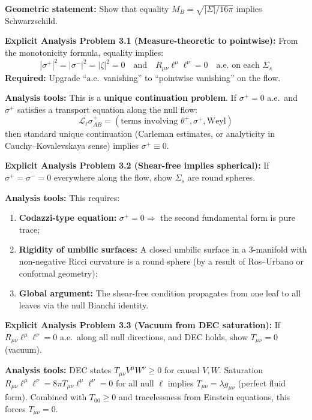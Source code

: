 \begin{remark}
\textbf{Geometric statement:} Show that equality $M_B = \sqrt{|\Sigma|/16\pi}$ implies Schwarzschild.

\textbf{Explicit Analysis Problem 3.1 (Measure-theoretic to pointwise):}
From the monotonicity formula, equality implies:
\begin{equation}
\label{eq:rigidity-vanishing}
|\sigma^+|^2 = |\sigma^-|^2 = |\zeta|^2 = 0 \quad \text{and} \quad R_{\mu\nu}\ell^\mu\ell^\nu = 0 \quad \text{a.e.\ on each } \Sigma_s
\end{equation}
\textbf{Required:} Upgrade ``a.e.\ vanishing'' to ``pointwise vanishing'' on the flow.

\textbf{Analysis tools:} This is a \textbf{unique continuation problem}. If $\sigma^+ = 0$ a.e.\ and $\sigma^+$ satisfies a transport equation along the null flow:
$$\mathcal{L}_\ell \sigma^+_{AB} = (\text{terms involving } \theta^+, \sigma^+, \text{Weyl})$$
then standard unique continuation (Carleman estimates, or analyticity in Cauchy--Kovalevskaya sense) implies $\sigma^+ \equiv 0$.

\textbf{Explicit Analysis Problem 3.2 (Shear-free implies spherical):}
If $\sigma^+ = \sigma^- = 0$ everywhere along the flow, show $\Sigma_s$ are round spheres.

\textbf{Analysis tools:} This requires:
\begin{enumerate}[label=(\roman*)]
\item \textbf{Codazzi-type equation:} $\sigma^+ = 0 \Rightarrow$ the second fundamental form is pure trace;
\item \textbf{Rigidity of umbilic surfaces:} A closed umbilic surface in a 3-manifold with non-negative Ricci curvature is a round sphere (by a result of Ros--Urbano or conformal geometry);
\item \textbf{Global argument:} The shear-free condition propagates from one leaf to all leaves via the null Bianchi identity.
\end{enumerate}

\textbf{Explicit Analysis Problem 3.3 (Vacuum from DEC saturation):}
If $R_{\mu\nu}\ell^\mu\ell^\nu = 0$ a.e.\ along all null directions, and DEC holds, show $T_{\mu\nu} = 0$ (vacuum).

\textbf{Analysis tools:} DEC states $T_{\mu\nu}V^\mu W^\nu \geq 0$ for causal $V, W$. Saturation $R_{\mu\nu}\ell^\mu \ell^\nu = 8\pi T_{\mu\nu}\ell^\mu\ell^\nu = 0$ for all null $\ell$ implies $T_{\mu\nu} = \lambda g_{\mu\nu}$ (perfect fluid form). Combined with $T_{00} \geq 0$ and tracelessness from Einstein equations, this forces $T_{\mu\nu} = 0$.


\end{remark}

